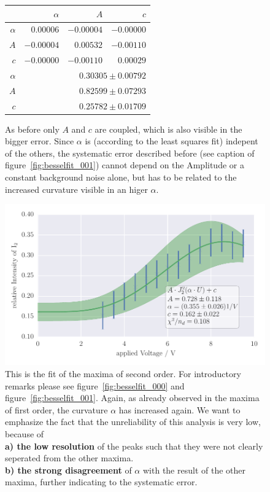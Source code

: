 \begin{figure}
\caption{
As before only $A$ and $c$ are coupled, which is also visible in the
bigger error. Since $\alpha$ is (according to the least squares fit)
indepent of the others, the systematic error described before (see caption of figure~\ref{fig:besselfit_001}) 
cannot depend on the Amplitude or a constant background noise alone, but has to be related to the increased curvature
visible in an higer $\alpha$.}
 \begin{tabular}{|r|r|r|r|}
 \hline 
\cellcolor{tabcolor}&\cellcolor{tabcolor}$\alpha$&\cellcolor{tabcolor}$A$&\cellcolor{tabcolor}$c$\\ \hline 
 \cellcolor{tabcolor}$\alpha$&$0.00006$ &$-0.00004$ &$-0.00000$ \\ 
\cellcolor{tabcolor}$A$&$-0.00004$ &$0.00532$ &$-0.00110$ \\ 
\cellcolor{tabcolor}$c$&$-0.00000$ &$-0.00110$ &$0.00029$ \\ \hline \hline
\cellcolor{tabcolor}$\alpha$&\multicolumn{3}{r|}{$0.30305 \pm 0.00792$ }\\ 
\cellcolor{tabcolor}$A$&\multicolumn{3}{r|}{$0.82599 \pm 0.07293$ }\\ 
\cellcolor{tabcolor}$c$&\multicolumn{3}{r|}{$0.25782 \pm 0.01709$ }\\ 
\hline\end{tabular}
\end{figure}
\newpage
\begin{figure}[htpb]
    \centering
    \includegraphics[width=1\textwidth]{analysis/figures/besselfit_002}
    \caption{This is the fit of the maxima of second order. For
    introductory remarks please see figure~\ref{fig:besselfit_000} and figure~\ref{fig:besselfit_001}.
    Again, as already observed in the maxima of first order, the curvature $\alpha$ has increased again.
    We want to emphasize the fact that the unreliability of this analysis is very low, because of \\
    \textbf{a) the low resolution} of the peaks such that they were not clearly seperated from the other maxima.\\
    \textbf{b) the strong disagreement} of $\alpha$ with the result of the other maxima, further indicating to the systematic error.   
    }
    \label{fig:besselfit_002}
\end{figure}

